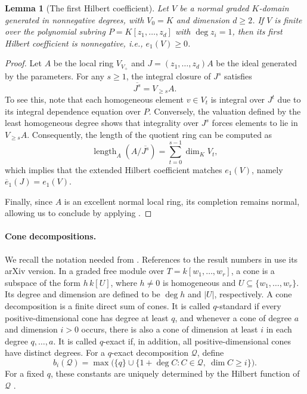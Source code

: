 \documentclass[12pt]{amsart}
\numberwithin{equation}{section}
\newtheorem{lemma}[theorem]{Lemma}
\theoremstyle{definition}
\theoremstyle{remark}
\numberwithin{equation}{section}
\begin{document}
\begin{lemma}[The first Hilbert coefficient]
\label{lem:normal-finite-e1}
Let $V$ be a normal graded $K$-domain generated in nonnegative degrees, with $V_0=K$ and dimension $d \ge 2$. If $V$ is finite over the polynomial subring $P=K[z_1,\ldots,z_d]$ with $\deg z_i=1$, then its first Hilbert coefficient is nonnegative, i.e., $e_1(V)\ge0$.
\end{lemma}
\begin{proof}
Let $A$ be the local ring $V_{V_+}$ and $J=(z_1,\ldots,z_d)A$ be the ideal generated by the parameters. For any $s \ge 1$, the integral closure of $J^s$ satisfies
 \[
\overline{J^s}=V_{\ge s}A.
\]
To see this, note that each homogeneous element $v \in V_t$ is integral over $J^t$ due to its integral dependence equation over $P$. Conversely, the valuation defined by the least homogeneous degree shows that integrality over $J^s$ forces elements to lie in $V_{\ge s}A$.
Consequently, the length of the quotient ring can be computed as
\[
\operatorname{length}_A(A/\overline{J^s}) = \sum_{t=0}^{s-1}\dim_KV_t,
\]
 which implies that the extended Hilbert coefficient matches $e_1(V)$, namely $\overline e_1(J)=e_1(V)$.

Finally, since $A$ is an excellent normal local ring, its completion remains normal, allowing us to conclude by applying \cite[Theorem~3.1]{MQ}.
\end{proof}

\paragraph{\textbf{Cone decompositions.}}
We recall the notation needed from \cite{Liang,Nagel}.  References to the result numbers in \cite{Liang} use its arXiv version. In a graded free module over $T=k[w_1,\ldots,w_r]$, a cone is a subspace of the form $h\,k[U]$, where $h\ne0$ is
homogeneous and $U\subseteq\{w_1,\ldots,w_r\}$. Its degree and dimension are defined to be $\deg h$ and $|U|$, respectively. A cone decomposition is a finite
direct sum of cones. It is called $q$-standard if every positive-dimensional cone has degree at least $q$, and whenever a cone of degree $a$ and dimension $i>0$ occurs, there is also a cone of dimension at least $i$ in each degree $q,\ldots,a$. It is called $q$-exact if, in addition, all positive-dimensional cones have distinct degrees.
For a $q$-exact decomposition $\mathcal Q$, define
\[
 b_i(\mathcal Q)=
 \max\bigl(\{q\}\cup
 \{1+\deg C:C\in\mathcal Q,\ \dim C\ge i\}\bigr).
\]
For a fixed $q$, these constants are uniquely determined by the Hilbert function of $\mathcal Q$
\cite[Lemma~26]{Liang}.
\end{document}
